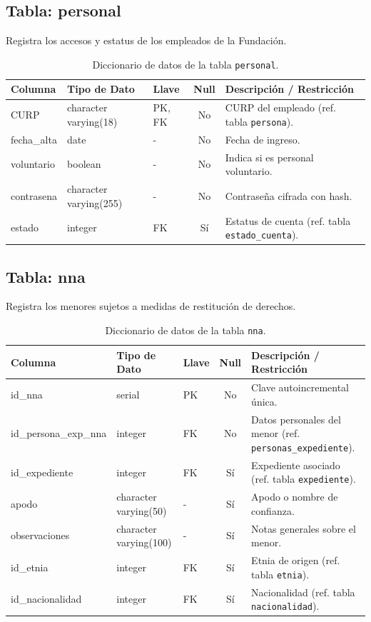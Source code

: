 \subsection{Tabla: personal}
Registra los accesos y estatus de los empleados de la Fundación.
\begin{table}[htbp!]
\centering
\begin{tabular}{|l|l|l|c|l|}
\hline
\textbf{Columna} & \textbf{Tipo de Dato} & \textbf{Llave} & \textbf{Null} & \textbf{Descripción / Restricción} \\
\hline
CURP & character varying(18) & PK, FK & No & CURP del empleado (ref. tabla \texttt{persona}). \\
fecha\_alta & date & - & No & Fecha de ingreso. \\
voluntario & boolean & - & No & Indica si es personal voluntario. \\
contrasena & character varying(255) & - & No & Contraseña cifrada con hash. \\
estado & integer & FK & Sí & Estatus de cuenta (ref. tabla \texttt{estado\_cuenta}). \\
\hline
\end{tabular}
\caption{Diccionario de datos de la tabla \texttt{personal}.}
\label{tbl:diccionarioPersonal}
\end{table}

\subsection{Tabla: nna}
Registra los menores sujetos a medidas de restitución de derechos.
\begin{table}[htbp!]
\centering
\begin{tabular}{|l|l|l|c|l|}
\hline
\textbf{Columna} & \textbf{Tipo de Dato} & \textbf{Llave} & \textbf{Null} & \textbf{Descripción / Restricción} \\
\hline
id\_nna & serial & PK & No & Clave autoincremental única. \\
id\_persona\_exp\_nna & integer & FK & No & Datos personales del menor (ref. \texttt{personas\_expediente}). \\
id\_expediente & integer & FK & Sí & Expediente asociado (ref. tabla \texttt{expediente}). \\
apodo & character varying(50) & - & Sí & Apodo o nombre de confianza. \\
observaciones & character varying(100) & - & Sí & Notas generales sobre el menor. \\
id\_etnia & integer & FK & Sí & Etnia de origen (ref. tabla \texttt{etnia}). \\
id\_nacionalidad & integer & FK & Sí & Nacionalidad (ref. tabla \texttt{nacionalidad}). \\
\hline
\end{tabular}
\caption{Diccionario de datos de la tabla \texttt{nna}.}
\label{tbl:diccionarioNna}
\end{table}

